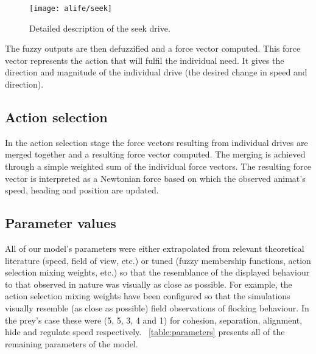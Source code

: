 \begin{subappendices}
\begin{figure}
  \texttt{[image: alife/seek]}
  \caption{Detailed description of the seek drive.}
  \label{figSeek}
\end{figure}

The fuzzy outputs are then defuzzified and a force vector computed. This force vector represents the action that will fulfil the individual need. It gives the direction and magnitude of the individual drive (the desired change in speed and direction).

\subsection{Action selection}
In the action selection stage the force vectors resulting from individual drives are merged together and a resulting force vector computed. The merging is achieved through a simple weighted sum of the individual force vectors. The resulting force vector is interpreted as a Newtonian force based on which the observed animat's speed, heading and position are updated.

\subsection{Parameter values}
All of our model's parameters were either extrapolated from relevant theoretical literature (\eg speed, field of view, etc.) or tuned (\eg fuzzy membership functions, action selection mixing weights, etc.) so that the resemblance of the displayed behaviour to that observed in nature was visually as close as possible. For example, the action selection mixing weights have been configured so that the simulations visually resemble (as close as possible) field observations of flocking behaviour. In the prey's case these were (5, 5, 3, 4 and 1) for cohesion, separation, alignment, hide and regulate speed respectively. \tablename~\ref{table:parameters} presents all of the remaining parameters of the model.


\end{subappendices}
